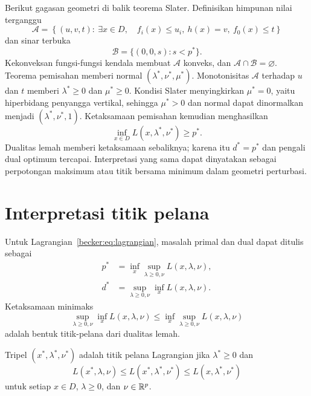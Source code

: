 Berikut gagasan geometri di balik teorema Slater. Definisikan himpunan nilai
terganggu
\begin{equation}
  \mathcal A=\left\{(u,v,t):\ \exists x\in D,\quad
  f_i(x)\leq u_i,\ h(x)=v,\ f_0(x)\leq t\right\}
\end{equation}
dan sinar terbuka
\begin{equation}
  \mathcal B=\{(0,0,s):s<p^*\}.
\end{equation}
Kekonveksan fungsi-fungsi kendala membuat $\mathcal A$ konveks, dan
$\mathcal A\cap\mathcal B=\varnothing$. Teorema pemisahan memberi normal
$(\lambda^*,\nu^*,\mu^*)$. Monotonisitas $\mathcal A$ terhadap $u$ dan $t$
memberi $\lambda^*\geq0$ dan $\mu^*\geq0$. Kondisi Slater menyingkirkan
$\mu^*=0$, yaitu hiperbidang penyangga vertikal, sehingga $\mu^*>0$ dan normal
dapat dinormalkan menjadi
$(\lambda^*,\nu^*,1)$. Ketaksamaan pemisahan kemudian menghasilkan
\begin{equation}
  \inf_{x\in D}L(x,\lambda^*,\nu^*)\geq p^*.
\end{equation}
Dualitas lemah memberi ketaksamaan sebaliknya; karena itu $d^*=p^*$ dan
pengali dual optimum tercapai. Interpretasi yang sama dapat dinyatakan sebagai
perpotongan maksimum atau titik bersama minimum dalam geometri perturbasi.

\section{Interpretasi titik pelana}

Untuk Lagrangian~\eqref{becker:eq:lagrangian}, masalah primal dan dual dapat
ditulis sebagai
\begin{equation}
  \begin{aligned}
    p^*&=\inf_x\sup_{\lambda\geq0,\nu}L(x,\lambda,\nu),\\
    d^*&=\sup_{\lambda\geq0,\nu}\inf_xL(x,\lambda,\nu).
  \end{aligned}
\end{equation}
Ketaksamaan minimaks
\begin{equation}
  \sup_{\lambda\geq0,\nu}\inf_xL(x,\lambda,\nu)
  \leq
  \inf_x\sup_{\lambda\geq0,\nu}L(x,\lambda,\nu)
\end{equation}
adalah bentuk titik-pelana dari dualitas lemah.

\begin{defn}
  Tripel $(x^*,\lambda^*,\nu^*)$ adalah titik pelana Lagrangian jika
  $\lambda^*\geq0$ dan
  \begin{equation}
    L(x^*,\lambda,\nu)
    \leq L(x^*,\lambda^*,\nu^*)
    \leq L(x,\lambda^*,\nu^*)
  \end{equation}
  untuk setiap $x\in D$, $\lambda\geq0$, dan $\nu\in\mathbb{R}^p$.
\end{defn}

